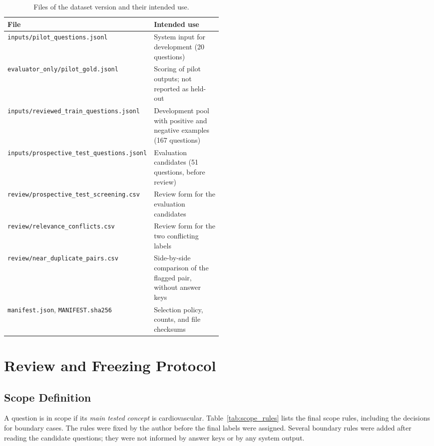\begin{table}[H]
\centering
\caption{Files of the dataset version \dataversion{} and their intended use.}
\label{tab:dataset_files}
\footnotesize
\begin{tabularx}{\linewidth}{>{\raggedright\arraybackslash}p{0.50\linewidth} >{\raggedright\arraybackslash}X}
\toprule
File & Intended use \\
\midrule
\texttt{inputs/pilot\_questions.jsonl} & System input for development (20 questions) \\
\texttt{evaluator\_only/pilot\_gold.jsonl} & Scoring of pilot outputs; not reported as held-out \\
\texttt{inputs/reviewed\_train\_questions.jsonl} & Development pool with positive and negative examples (167 questions) \\
\texttt{inputs/prospective\_test\_questions.jsonl} & Evaluation candidates (51 questions, before review) \\
\texttt{review/prospective\_test\_screening.csv} & Review form for the evaluation candidates \\
\texttt{review/relevance\_conflicts.csv} & Review form for the two conflicting labels \\
\texttt{review/near\_duplicate\_pairs.csv} & Side-by-side comparison of the flagged pair, without answer keys \\
\texttt{manifest.json}, \texttt{MANIFEST.sha256} & Selection policy, counts, and file checksums \\
\bottomrule
\end{tabularx}
\end{table}

\section{Review and Freezing Protocol}
\label{sec:review_protocol}

\subsection{Scope Definition}

A question is in scope if its \emph{main tested concept} is cardiovascular. Table~\ref{tab:scope_rules} lists the final scope rules, including the decisions for boundary cases. The rules were fixed by the author before the final labels were assigned. Several boundary rules were added after reading the candidate questions; they were not informed by answer keys or by any system output.

